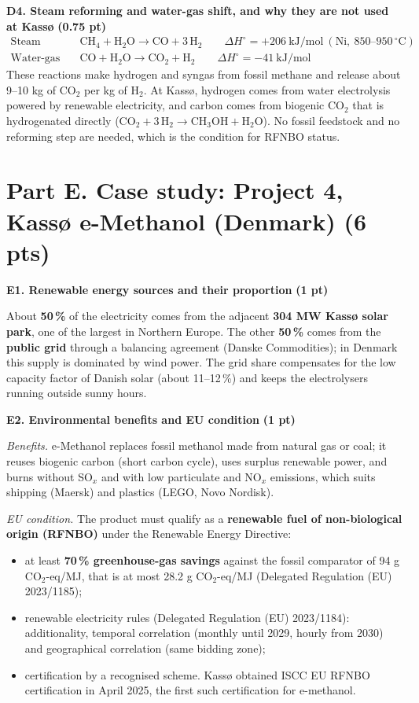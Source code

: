 \documentclass[11pt,a4paper]{article}
\newcommand{\pts}[1]{\hfill{\normalsize\textbf{(#1)}}}
\begin{document}
\textbf{D4. Steam reforming and water-gas shift, and why they are not used at Kassø} \pts{0.75 pt}
\begin{align*}
\text{Steam methane reforming:}\quad & \mathrm{CH_4 + H_2O \longrightarrow CO + 3\,H_2} \qquad \Delta H^\circ = +206\ \mathrm{kJ/mol}\ (\text{Ni},\ 850\text{--}950\,^\circ\mathrm{C})\\
\text{Water-gas shift:}\quad & \mathrm{CO + H_2O \longrightarrow CO_2 + H_2} \qquad \Delta H^\circ = -41\ \mathrm{kJ/mol}
\end{align*}
These reactions make hydrogen and syngas from fossil methane and release about 9--10 kg of CO$_2$ per kg of H$_2$. At
Kassø, hydrogen comes from water electrolysis powered by renewable electricity, and carbon comes from biogenic CO$_2$
that is hydrogenated directly ($\mathrm{CO_2 + 3\,H_2 \rightarrow CH_3OH + H_2O}$). No fossil feedstock and no
reforming step are needed, which is the condition for RFNBO status.

\section{Part E. Case study: Project 4, Kassø e-Methanol (Denmark) \pts{6 pts}}

\textbf{E1. Renewable energy sources and their proportion} \pts{1 pt}

About \textbf{50\,\%} of the electricity comes from the adjacent \textbf{304 MW Kassø solar park}, one of the
largest in Northern Europe. The other \textbf{50\,\%} comes from the \textbf{public grid} through a balancing
agreement (Danske Commodities); in Denmark this supply is dominated by wind power. The grid share compensates for
the low capacity factor of Danish solar (about 11--12\,\%) and keeps the electrolysers running outside sunny hours.

\textbf{E2. Environmental benefits and EU condition} \pts{1 pt}

\textit{Benefits.} e-Methanol replaces fossil methanol made from natural gas or coal; it reuses biogenic carbon
(short carbon cycle), uses surplus renewable power, and burns without SO$_x$ and with low particulate and NO$_x$
emissions, which suits shipping (Maersk) and plastics (LEGO, Novo Nordisk).

\textit{EU condition.} The product must qualify as a \textbf{renewable fuel of non-biological origin (RFNBO)}
under the Renewable Energy Directive:
\begin{itemize}
  \item at least \textbf{70\,\% greenhouse-gas savings} against the fossil comparator of 94 g CO$_2$-eq/MJ, that is
        at most 28.2 g CO$_2$-eq/MJ (Delegated Regulation (EU) 2023/1185);
  \item renewable electricity rules (Delegated Regulation (EU) 2023/1184): additionality, temporal correlation
        (monthly until 2029, hourly from 2030) and geographical correlation (same bidding zone);
  \item certification by a recognised scheme. Kassø obtained ISCC EU RFNBO certification in April 2025, the first
        such certification for e-methanol.
\end{itemize}
\end{document}
